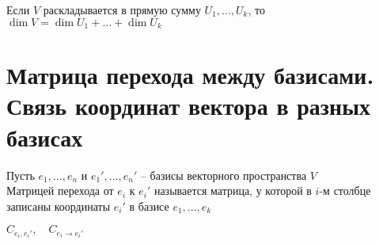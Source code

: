 \begin{implication}
	Если $ V $ раскладывается в прямую сумму $ U_1, ..., U_k $, то $ \dim V = \dim U_1 + ... + \dim U_k $
\end{implication}

\section{Матрица перехода между базисами. Связь координат вектора в разных базисах}

\begin{definition}
	Пусть $ e_1, ..., e_n $ и $ e_1', ..., e_n' $ -- базисы векторного пространства $ V $ \\
	Матрицей перехода от $ e_i $ к $ e_i'$ называется матрица, у которой в $ i $-м столбце записаны координаты $ e_i' $ в базисе $ e_1, ..., e_k $
\end{definition}

\begin{notation}
	$ C_{e_i, e_i'}, \quad C_{e_i \to e_i'} $
\end{notation}

